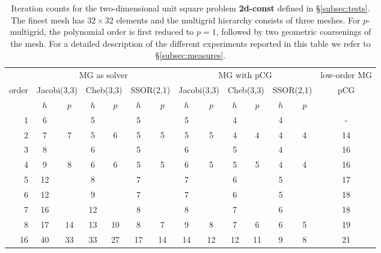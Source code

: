\documentclass[times]{nlaauth}
\newcommand{\gsnote}[1]{\textcolor{blue}{GS: #1}}
\begin{document}

\begin{table}
  \caption{\label{tab:box} Iteration counts for the two-dimensional unit square
    problem {\bf 2d-const} defined in \S\ref{subsec:tests}. The finest
    mesh has $32\times 32$ elements and the multigrid hierarchy
    consists of  three meshes.  For $p$-multigrid, the
    polynomial order is first reduced to $p=1$, followed by two
    geometric coarsenings of the mesh.  For a detailed description of
    the different experiments reported in this table we refer to
    \S\ref{subsec:measures}.}  \centering
  \begin{tabular}{|r|c c|c c|c c||c c|c c|c c||c|} 
    \hline
    & \multicolumn{6}{c||}{MG as solver} & \multicolumn{6}{c||}{MG
      with pCG} & \!\!low-order MG\!\! \\
    \cline{2-13}
    \!\!\! order \!\!\!\! &  \multicolumn{2}{c|}{\!\!\scriptsize  Jacobi(3,3)\!\!} &  \multicolumn{2}{c|}{\!\!\scriptsize Cheb(3,3)\!\!} & \multicolumn{2}{c||}{\!\!\scriptsize  SSOR(2,1)\!\!} & \multicolumn{2}{c|}{\!\!\scriptsize Jacobi(3,3)\!\!} &  \multicolumn{2}{c|}{\!\!\scriptsize Cheb(3,3)\!\!} & \multicolumn{2}{c||}{\!\!\scriptsize SSOR(2,1)\!\!} & pCG \\
\hline
 & $h$ & $p$ & $h$ & $p$& $h$ & $p$& $h$ & $p$& $h$ & $p$& $h$ & $p$&
~ \\
 \cline{2-13}
1 & 6 & & 5 & & 5 & & 5 & & 4 & & 4 & & -   \\
2 & 7 & 7 & 5 & 6 & 5 & 5 & 5 & 5 & 4 & 4 & 4 & 4 & 14  \\
3 & 8 & & 6 & & 5 & & 6 & & 5 & & 4 & & 16   \\
4 & 9 & 8 & 6 & 6 & 5 & 5 & 6 & 5 & 5 & 5 & 4 & 4 & 16  \\
5 & 12 & & 8 & & 7 & & 7 & & 6 & & 5 & & 17 \\
6 & 12 & & 9 & & 7 & & 7 & & 6 & & 5 & & 18 \\
7 & 16 & & 12 & & 8 & & 8 & & 7 & & 6 & & 18  \\
8 & 17 & 14 & 13 & 10 & 8 & 7 & 9 & 8 & 7 & 6 & 6 & 5 & 19 \\
16 & 40 & 33 & 33 & 27 & 17 & 14 & 14 & 12 & 12 & 11 & 9 & 8 & 21 \\
\hline
  \end{tabular}
\end{table}
\end{document}
